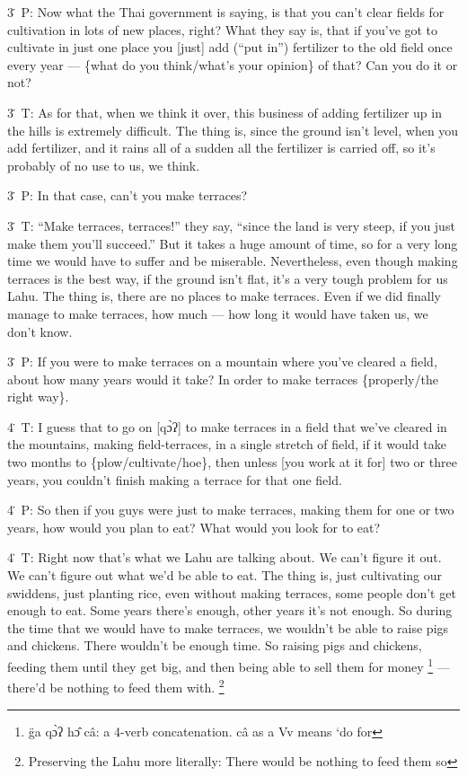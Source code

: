 3\. P: Now what the Thai government is saying, is that you can't clear fields for
cultivation in lots of new places, right? What they say is, that if you've got
to cultivate in just one place you [just] add (``put in'') fertilizer to the old
field once every year --- \{what do you think/what's your opinion\} of that? Can
you do it or not?

3\. T: As for that, when we think it over, this business of adding fertilizer up
in the hills is extremely difficult. The thing is, since the ground isn't level,
when you add fertilizer, and it rains all of a sudden all the fertilizer is carried
off, so it's probably of no use to us, we think.

3\. P: In that case, can't you make terraces?

3\. T: ``Make terraces, terraces!'' they say, ``since the land is very steep, if
you just make them you'll succeed.'' But it takes a huge amount of time, so for
a very long time we would have to suffer and be miserable. Nevertheless, even though
making terraces is the best way, if the ground isn't flat, it's a very tough problem
for us Lahu. The thing is, there are no places to make terraces. Even if we did
finally manage to make terraces, how much --- how long it would have taken us,
we don't know.

3\. P: If you were to make terraces on a mountain where you've cleared a field,
about how many years would it take? In order to make terraces \{properly/the right
way\}.

4\. T: I guess that to go on [qɔ̀ʔ] to make terraces in a field that we've cleared
in the mountains, making field-terraces, in a single stretch of field, if it would
take two months to \{plow/cultivate/hoe\}, then unless [you work at it for] two
or three years, you couldn't finish making a terrace for that one field.

4\. P: So then if you guys were just to make terraces, making them for one or two
years, how would you plan to eat? What would you look for to eat?

4\. T: Right now that's what we Lahu are talking about. We can't figure it out.
We can't figure out what we'd be able to eat. The thing is, just cultivating our
swiddens, just planting rice, even without making terraces, some people don't get
enough to eat. Some years there's enough, other years it's not enough. So during
the time that we would have to make terraces, we wouldn't be able to raise pigs
and chickens. There wouldn't be enough time. So raising pigs and chickens, feeding
them until they get big, and then being able to sell them for money \footnote{g̈a qɔ̀ʔ hɔ̂ câ: a 4-verb concatenation. câ as a Vv means `do for} --- there'd
be nothing to feed them with. \footnote{Preserving the Lahu more literally: There would be nothing to feed them so}

